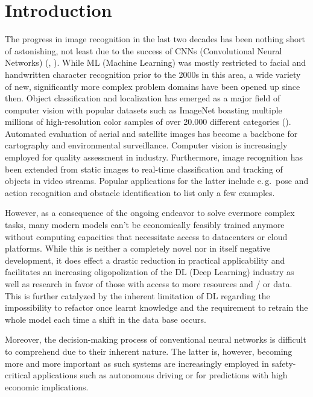 \section{Introduction%
         \label{sec:introduction}}

The progress in image recognition in the last two decades has been nothing short of astonishing, not least due to the success of CNNs (Convolutional Neural Networks) (\cite{LeCun1999-ff}, \cite{Alom2018-yo}). While ML (Machine Learning) was mostly restricted to facial and handwritten character recognition prior to the 2000s in this area, a wide variety of new, significantly more complex problem domains have been opened up since then. Object classification and localization has emerged as a major field of computer vision with popular datasets such as ImageNet boasting multiple millions of high-resolution color samples of over 20.000 different categories (\cite{Deng2009-iz}). Automated evaluation of aerial and satellite images has become a backbone for cartography and environmental surveillance. Computer vision is increasingly employed for quality assessment in industry. Furthermore, image recognition has been extended from static images to real-time classification and tracking of objects in video streams. Popular applications for the latter include e.\,g.\ pose and action recognition and obstacle identification to list only a few examples.

However, as a consequence of the ongoing endeavor to solve evermore complex tasks, many modern models can't be economically feasibly trained anymore without computing capacities that necessitate access to datacenters or cloud platforms. While this is neither a completely novel nor in itself negative development, it does effect a drastic reduction in practical applicability and facilitates an increasing oligopolization of the DL (Deep Learning) industry as well as research in favor of those with access to more resources and / or data. This is further catalyzed by the inherent limitation of DL regarding the impossibility to refactor once learnt knowledge and the requirement to retrain the whole model each time a shift in the data base occurs.

Moreover, the decision-making process of conventional neural networks is difficult to comprehend due to their inherent nature. The latter is, however, becoming more and more important as such systems are increasingly employed in safety-critical applications such as autonomous driving or for predictions with high economic implications.

